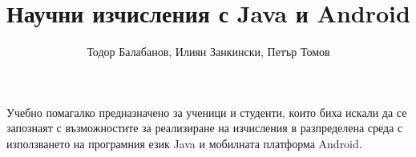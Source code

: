 \documentclass[ebook,12pt,oneside,openany]{memoir}
\title{Научни изчисления с Java и Android}
\author{Тодор Балабанов, Илиян Занкински, Петър Томов}
\begin{document}
\maketitle

Учебно помагалко предназначено за ученици и студенти, които биха искали да се запознаят с възможностите за реализиране на изчисления в разпределена среда с използването на програмния език Java и мобилната платформа Android.
\end{document}
